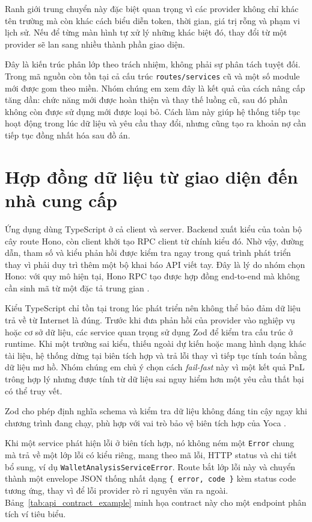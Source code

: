 Ranh giới trung chuyển này đặc biệt quan trọng vì các provider không chỉ khác tên trường mà còn khác cách biểu diễn token, thời gian, giá trị rỗng và phạm vi lịch sử. Nếu để từng màn hình tự xử lý những khác biệt đó, thay đổi từ một provider sẽ lan sang nhiều thành phần giao diện.

Đây là kiến trúc phân lớp theo trách nhiệm, không phải sự phân tách tuyệt đối. Trong mã nguồn còn tồn tại cả cấu trúc \texttt{routes/services} cũ và một số module mới được gom theo miền. Nhóm chúng em xem đây là kết quả của cách nâng cấp tăng dần: chức năng mới được hoàn thiện và thay thế luồng cũ, sau đó phần không còn được sử dụng mới được loại bỏ. Cách làm này giúp hệ thống tiếp tục hoạt động trong lúc dữ liệu và yêu cầu thay đổi, nhưng cũng tạo ra khoản nợ cần tiếp tục đồng nhất hóa sau đồ án.

\section{Hợp đồng dữ liệu từ giao diện đến nhà cung cấp}

Ứng dụng dùng TypeScript ở cả client và server. Backend xuất kiểu của toàn bộ cây route Hono, còn client khởi tạo RPC client từ chính kiểu đó. Nhờ vậy, đường dẫn, tham số và kiểu phản hồi được kiểm tra ngay trong quá trình phát triển thay vì phải duy trì thêm một bộ khai báo API viết tay. Đây là lý do nhóm chọn Hono: với quy mô hiện tại, Hono RPC tạo được hợp đồng end-to-end mà không cần sinh mã từ một đặc tả trung gian \cite{hono}.

Kiểu TypeScript chỉ tồn tại trong lúc phát triển nên không thể bảo đảm dữ liệu trả về từ Internet là đúng. Trước khi đưa phản hồi của provider vào nghiệp vụ hoặc cơ sở dữ liệu, các service quan trọng sử dụng Zod để kiểm tra cấu trúc ở runtime. Khi một trường sai kiểu, thiếu ngoài dự kiến hoặc mang hình dạng khác tài liệu, hệ thống dừng tại biên tích hợp và trả lỗi thay vì tiếp tục tính toán bằng dữ liệu mơ hồ. Nhóm chúng em chủ ý chọn cách \textit{fail-fast} này vì một kết quả PnL trông hợp lý nhưng được tính từ dữ liệu sai nguy hiểm hơn một yêu cầu thất bại có thể truy vết.

Zod cho phép định nghĩa schema và kiểm tra dữ liệu không đáng tin cậy ngay khi chương trình đang chạy, phù hợp với vai trò bảo vệ biên tích hợp của Yoca \cite{zod}.

Khi một service phát hiện lỗi ở biên tích hợp, nó không ném một \texttt{Error} chung mà trả về một lớp lỗi có kiểu riêng, mang theo mã lỗi, HTTP status và chi tiết bổ sung, ví dụ \texttt{WalletAnalysisServiceError}. Route bắt lớp lỗi này và chuyển thành một envelope JSON thống nhất dạng \texttt{\{ error, code \}} kèm status code tương ứng, thay vì để lỗi provider rò rỉ nguyên văn ra ngoài. Bảng~\ref{tab:api_contract_example} minh họa contract này cho một endpoint phân tích ví tiêu biểu.

